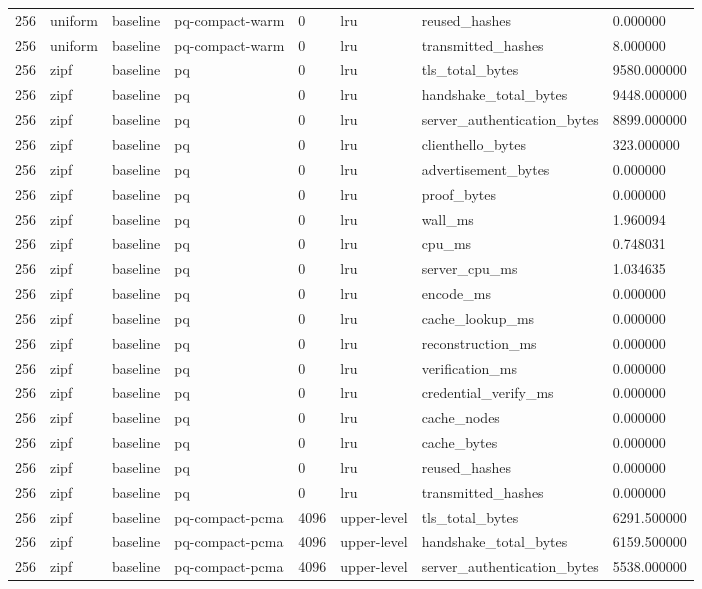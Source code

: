 \begin{tabular}{llllllll}
256 & uniform & baseline & pq-compact-warm & 0 & lru & reused\_hashes & 0.000000 \\
256 & uniform & baseline & pq-compact-warm & 0 & lru & transmitted\_hashes & 8.000000 \\
256 & zipf & baseline & pq & 0 & lru & tls\_total\_bytes & 9580.000000 \\
256 & zipf & baseline & pq & 0 & lru & handshake\_total\_bytes & 9448.000000 \\
256 & zipf & baseline & pq & 0 & lru & server\_authentication\_bytes & 8899.000000 \\
256 & zipf & baseline & pq & 0 & lru & clienthello\_bytes & 323.000000 \\
256 & zipf & baseline & pq & 0 & lru & advertisement\_bytes & 0.000000 \\
256 & zipf & baseline & pq & 0 & lru & proof\_bytes & 0.000000 \\
256 & zipf & baseline & pq & 0 & lru & wall\_ms & 1.960094 \\
256 & zipf & baseline & pq & 0 & lru & cpu\_ms & 0.748031 \\
256 & zipf & baseline & pq & 0 & lru & server\_cpu\_ms & 1.034635 \\
256 & zipf & baseline & pq & 0 & lru & encode\_ms & 0.000000 \\
256 & zipf & baseline & pq & 0 & lru & cache\_lookup\_ms & 0.000000 \\
256 & zipf & baseline & pq & 0 & lru & reconstruction\_ms & 0.000000 \\
256 & zipf & baseline & pq & 0 & lru & verification\_ms & 0.000000 \\
256 & zipf & baseline & pq & 0 & lru & credential\_verify\_ms & 0.000000 \\
256 & zipf & baseline & pq & 0 & lru & cache\_nodes & 0.000000 \\
256 & zipf & baseline & pq & 0 & lru & cache\_bytes & 0.000000 \\
256 & zipf & baseline & pq & 0 & lru & reused\_hashes & 0.000000 \\
256 & zipf & baseline & pq & 0 & lru & transmitted\_hashes & 0.000000 \\
256 & zipf & baseline & pq-compact-pcma & 4096 & upper-level & tls\_total\_bytes & 6291.500000 \\
256 & zipf & baseline & pq-compact-pcma & 4096 & upper-level & handshake\_total\_bytes & 6159.500000 \\
256 & zipf & baseline & pq-compact-pcma & 4096 & upper-level & server\_authentication\_bytes & 5538.000000 \\

\end{tabular}

